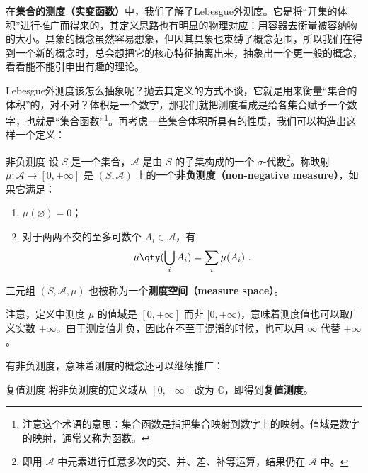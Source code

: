 

在\textbf{集合的测度（实变函数）}中，我们了解了Lebesgue外测度。它是将“开集的体积”进行推广而得来的，其定义思路也有明显的物理对应：用容器去衡量被容纳物的大小。具象的概念虽然容易想象，但因其具象也束缚了概念范围，所以我们在得到一个新的概念时，总会想把它的核心特征抽离出来，抽象出一个更一般的概念，看看能不能引申出有趣的理论。

Lebesgue外测度该怎么抽象呢？抛去其定义的方式不谈，它就是用来衡量“集合的体积”的，对不对？体积是一个数字，那我们就把测度看成是给各集合赋予一个数字，也就是“集合函数”\footnote{注意这个术语的意思：集合函数是指把集合映射到数字上的映射。值域是数字的映射，通常又称为函数。}。再考虑一些集合体积所具有的性质，我们可以构造出这样一个定义：

\begin{definition}{非负测度}\label{GenFun_def1}
设 $S$ 是一个集合，$\mathcal{A}$ 是由 $S$ 的子集构成的一个 $\sigma$-代数\footnote{即用 $\mathcal{A}$ 中元素进行任意多次的交、并、差、补等运算，结果仍在 $\mathcal{A}$ 中。}。称映射 $\mu:\mathcal{A}\to [0, +\infty]$ 是 $(S, \mathcal{A})$ 上的一个\textbf{非负测度（non-negative measure）}，如果它满足：
\begin{enumerate}
\item $\mu(\varnothing)=0$；\\
\item 对于两两不交的至多可数个 $A_i\in\mathcal{A}$，有
\begin{equation}
\mu\qty(\bigcup_i A_i) = \sum_i \mu(A_i)~.
\end{equation}
\end{enumerate}


三元组 $(S, \mathcal{A}, \mu)$ 也被称为一个\textbf{测度空间（measure space）}。

\end{definition}

注意，定义中测度 $\mu$ 的值域是 $[0, +\infty]$ 而非 $[0, +\infty)$，意味着测度值也可以取广义实数 $+\infty$。由于测度值非负，因此在不至于混淆的时候，也可以用 $\infty$ 代替 $+\infty$。

有非负测度，意味着测度的概念还可以继续推广：

\begin{definition}{复值测度}
将非负测度的定义域从 $[0, +\infty]$ 改为 $\mathbb{C}$，即得到\textbf{复值测度}。
\end{definition}

